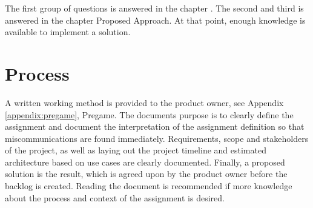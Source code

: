 The first group of questions is answered in the chapter . The second and third is answered in the chapter Proposed Approach. At that point, enough knowledge is available to implement a solution.

%
\section{Process}

A written working method is provided to the product owner, see Appendix \ref{appendix:pregame}, Pregame. The documents purpose is to clearly define the assignment and document the interpretation of the assignment definition so that miscommunications are found immediately. Requirements, scope and stakeholders of the project, as well as laying out the project timeline and estimated architecture based on use cases are clearly documented. Finally, a proposed solution is the result, which is agreed upon by the product owner before the backlog is created. Reading the document is recommended if more knowledge about the process and context of the assignment is desired.
